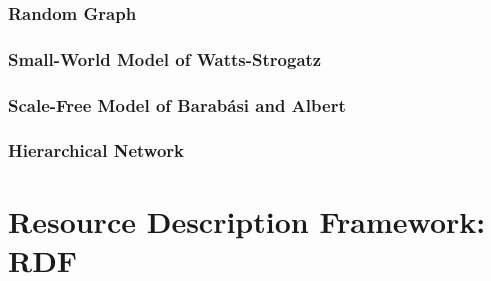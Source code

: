 \subsubsection{Random Graph}

\subsubsection{Small-World Model of Watts-Strogatz}

\subsubsection{Scale-Free Model of Barabási and Albert}

\subsubsection{Hierarchical Network}
\section{Resource Description Framework: RDF} \label{section:rdf}

